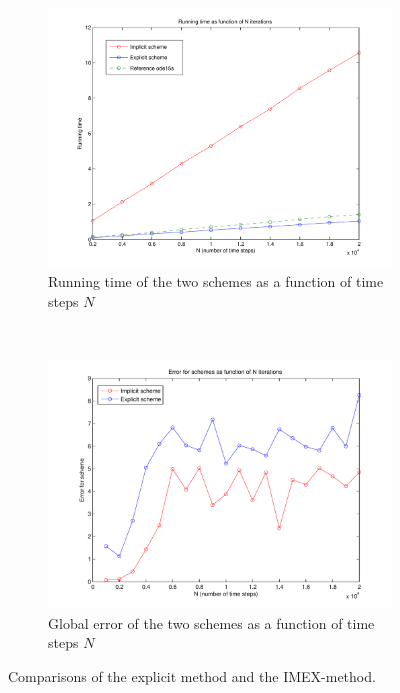 \begin{figure}[H]
        \centering
        \begin{subfigure}[b]{0.52\textwidth}
                \includegraphics[width=\textwidth]{../PDFs/Comparisons/running_time3.pdf}
                \caption{Running time of the two schemes as a function of time steps $N$}
                \label{fig:runTime}
        \end{subfigure}%
        ~
        \begin{subfigure}[b]{0.52\textwidth}
                \includegraphics[width=\textwidth]{../PDFs/Comparisons/error_compare.pdf}
                \caption{Global error of the two schemes as a function of time steps $N$}
                \label{fig:solImp}
        \end{subfigure}
        \caption{Comparisons of the explicit method and the IMEX-method.}
        \label{fig:runTimeN}
\end{figure}

